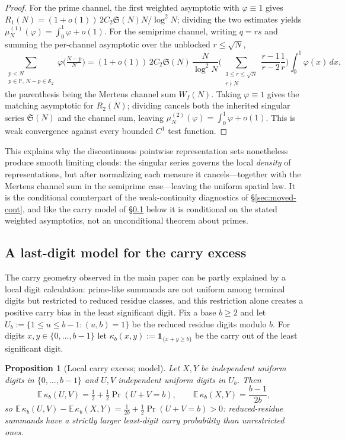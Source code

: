 \documentclass[11pt]{article}
\newcommand{\PP}{\mathbb P}
\newcommand{\SSemi}{\mathcal S_2}
\newcommand{\ones}{\mathbf 1}
\newcommand{\sing}{\mathfrak S}
\newtheorem{proposition}{Proposition}
\begin{document}
\begin{proof}
For the prime channel, the first weighted asymptotic with $\varphi\equiv1$ gives
$R_1(N)=(1+o(1))\,2C_2\sing(N)N/\log^2N$; dividing the two estimates yields
$\mu_N^{(1)}(\varphi)=\int_0^1\varphi+o(1)$. For the semiprime channel, writing $q=rs$ and
summing the per-channel asymptotic over the unblocked $r\le\sqrt N$,
\[
  \sum_{\substack{p<N\\ p\in\PP,\,N-p\in\SSemi}}\varphi\Big(\tfrac{N-p}{N}\Big)
  =(1+o(1))\,2C_2\sing(N)\,\frac{N}{\log^2N}
  \Big(\!\!\sum_{\substack{3\le r\le\sqrt N\\ r\nmid N}}\!\!\frac{r-1}{r-2}\frac1r\Big)\int_0^1\varphi(x)\,dx ,
\]
the parenthesis being the Mertens channel sum $W_f(N)$. Taking $\varphi\equiv1$ gives
the matching asymptotic for $R_2(N)$; dividing cancels both the inherited singular series
$\sing(N)$ and the channel sum, leaving $\mu_N^{(2)}(\varphi)=\int_0^1\varphi+o(1)$. This is
weak convergence against every bounded $C^1$ test function.
\end{proof}

This explains why the discontinuous pointwise representation sets nonetheless produce smooth
limiting clouds: the singular series governs the local \emph{density} of representations, but
after normalizing each measure it cancels---together with the Mertens channel sum in the
semiprime case---leaving the uniform spatial law. It is the conditional counterpart of the
weak-continuity diagnostics of \S\ref{sec:moved-cont}, and like the carry model of
\S\ref{sec:carry-model} below it is conditional on the stated weighted asymptotics, not an
unconditional theorem about primes.


\subsection{A last-digit model for the carry excess}
\label{sec:carry-model}

The carry geometry observed in the main paper can be partly explained by a local digit
calculation: prime-like summands are not uniform among terminal digits but restricted to
reduced residue classes, and this restriction alone creates a positive carry bias in the least
significant digit. Fix a base $b\ge2$ and let $U_b:=\{1\le u\le b-1:(u,b)=1\}$ be the reduced
residue digits modulo $b$. For digits $x,y\in\{0,\dots,b-1\}$ let
$\kappa_b(x,y):=\ones_{\{x+y\ge b\}}$ be the carry out of the least significant digit.

\begin{proposition}[Local carry excess; model]\label{prop:carry}
Let $X,Y$ be independent uniform digits in $\{0,\dots,b-1\}$ and $U,V$ independent uniform
digits in $U_b$. Then
\[
  \mathbb E\,\kappa_b(U,V)=\tfrac12+\tfrac12\Pr(U+V=b),\qquad
  \mathbb E\,\kappa_b(X,Y)=\frac{b-1}{2b},
\]
so $\mathbb E\,\kappa_b(U,V)-\mathbb E\,\kappa_b(X,Y)=\frac1{2b}+\tfrac12\Pr(U+V=b)>0$:
reduced-residue summands have a strictly larger least-digit carry probability than
unrestricted ones.
\end{proposition}
\end{document}
